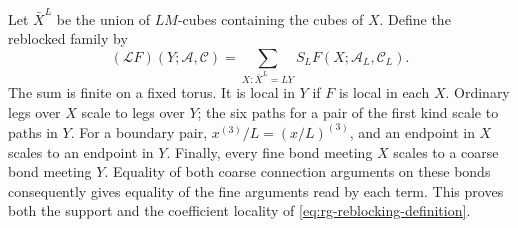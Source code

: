 Let $\bar X^L$ be the union of $LM$-cubes containing the cubes
of $X$. Define the reblocked family by
\begin{equation}\label{eq:rg-reblocking-definition}
 (\mathcal L F)(Y;\mathscr A,\mathscr C)
       =\sum_{X:\bar X^L=LY}S_L
                          F(X;\mathscr A_L,\mathscr C_L).
\end{equation}
The sum is finite on a fixed torus. It is local in $Y$ if
$F$ is local in each $X$. Ordinary legs over $X$ scale to
legs over $Y$; the six paths for a pair of the first kind
scale to paths in $Y$. For a boundary pair,
$x^{(3)}/L=(x/L)^{(3)}$, and an endpoint in $X$ scales to
an endpoint in $Y$. Finally, every fine bond meeting $X$
scales to a coarse bond meeting $Y$. Equality of both
coarse connection arguments on these bonds consequently
gives equality of the fine arguments read by each term.
This proves both the support and the coefficient locality
of \eqref{eq:rg-reblocking-definition}.

